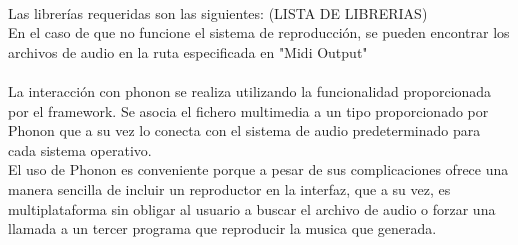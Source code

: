 \\Las librerías requeridas son las siguientes: (LISTA DE LIBRERIAS)
\\En el caso de que no funcione el sistema de reproducción, se pueden encontrar los archivos de audio en la ruta especificada en "Midi Output"
\newline
\\
\\La interacción con phonon se realiza utilizando la funcionalidad proporcionada por el framework. Se asocia el fichero multimedia a un tipo proporcionado por Phonon que a su vez lo conecta con el sistema de audio predeterminado para cada sistema operativo.
\\El uso de Phonon es conveniente porque a pesar de sus complicaciones ofrece una manera sencilla de incluir un reproductor en la interfaz, que a su vez, es multiplataforma sin obligar al usuario a buscar el archivo de audio o forzar una llamada a un tercer programa que reproducir la musica que generada.